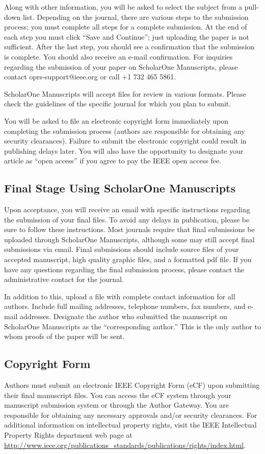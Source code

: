 \documentclass[twoside,web]{ieeecolor}
\begin{document}
Along with other information, you will be asked to select the subject from a 
pull-down list. Depending on the journal, there are various steps to the 
submission process; you must complete all steps for a complete submission. 
At the end of each step you must click ``Save and Continue''; just uploading 
the paper is not sufficient. After the last step, you should see a 
confirmation that the submission is complete. You should also receive an 
e-mail confirmation. For inquiries regarding the submission of your paper on 
ScholarOne Manuscripts, please contact oprs-support@ieee.org or call +1 732 
465 5861.

ScholarOne Manuscripts will accept files for review in various formats. 
Please check the guidelines of the specific journal for which you plan to 
submit.

You will be asked to file an electronic copyright form immediately upon 
completing the submission process (authors are responsible for obtaining any 
security clearances). Failure to submit the electronic copyright could 
result in publishing delays later. You will also have the opportunity to 
designate your article as ``open access'' if you agree to pay the IEEE open 
access fee. 

\subsection{Final Stage Using ScholarOne Manuscripts}
Upon acceptance, you will receive an email with specific instructions 
regarding the submission of your final files. To avoid any delays in 
publication, please be sure to follow these instructions. Most journals 
require that final submissions be uploaded through ScholarOne Manuscripts, 
although some may still accept final submissions via email. Final 
submissions should include source files of your accepted manuscript, high 
quality graphic files, and a formatted pdf file. If you have any questions 
regarding the final submission process, please contact the administrative 
contact for the journal. 

In addition to this, upload a file with complete contact information for all 
authors. Include full mailing addresses, telephone numbers, fax numbers, and 
e-mail addresses. Designate the author who submitted the manuscript on 
ScholarOne Manuscripts as the ``corresponding author.'' This is the only 
author to whom proofs of the paper will be sent. 

\subsection{Copyright Form}
Authors must submit an electronic IEEE Copyright Form (eCF) upon submitting 
their final manuscript files. You can access the eCF system through your 
manuscript submission system or through the Author Gateway. You are 
responsible for obtaining any necessary approvals and/or security 
clearances. For additional information on intellectual property rights, 
visit the IEEE Intellectual Property Rights department web page at 
\underline{http://www.ieee.org/publications\_standards/publications/rights/}\discretionary{}{}{}\underline{index.html}. 
\end{document}
